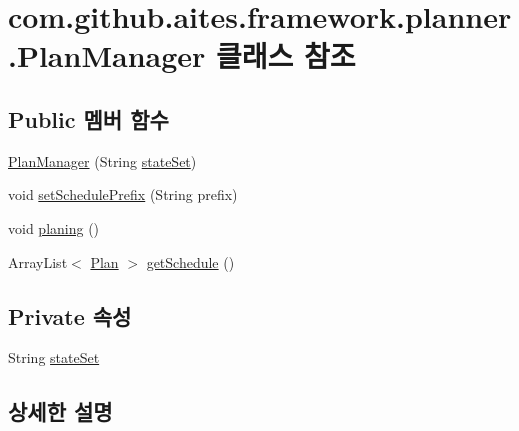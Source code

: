 \hypertarget{classcom_1_1github_1_1aites_1_1framework_1_1planner_1_1_plan_manager}{}\section{com.\+github.\+aites.\+framework.\+planner.\+Plan\+Manager 클래스 참조}
\label{classcom_1_1github_1_1aites_1_1framework_1_1planner_1_1_plan_manager}
\subsection*{Public 멤버 함수}
\begin{DoxyCompactItemize}
\item 
\mbox{\hyperlink{classcom_1_1github_1_1aites_1_1framework_1_1planner_1_1_plan_manager_a2333aa3668c9f3cf8743596ade58e4f3}{Plan\+Manager}} (String \mbox{\hyperlink{classcom_1_1github_1_1aites_1_1framework_1_1planner_1_1_plan_manager_a589a85c4c5b93ce2319ab116a4cca752}{state\+Set}})
\item 
void \mbox{\hyperlink{classcom_1_1github_1_1aites_1_1framework_1_1planner_1_1_plan_manager_a675d5c33e24e10824f98ea062791a051}{set\+Schedule\+Prefix}} (String prefix)
\item 
void \mbox{\hyperlink{classcom_1_1github_1_1aites_1_1framework_1_1planner_1_1_plan_manager_a53031b4950970b30a52ddba619169573}{planing}} ()
\item 
Array\+List$<$ \mbox{\hyperlink{classcom_1_1github_1_1aites_1_1framework_1_1planner_1_1_plan}{Plan}} $>$ \mbox{\hyperlink{classcom_1_1github_1_1aites_1_1framework_1_1planner_1_1_plan_manager_a4573c0e2a51a3549ddebe982b0b5077b}{get\+Schedule}} ()
\end{DoxyCompactItemize}
\subsection*{Private 속성}
\begin{DoxyCompactItemize}
\item 
String \mbox{\hyperlink{classcom_1_1github_1_1aites_1_1framework_1_1planner_1_1_plan_manager_a589a85c4c5b93ce2319ab116a4cca752}{state\+Set}}
\end{DoxyCompactItemize}


\subsection{상세한 설명}


